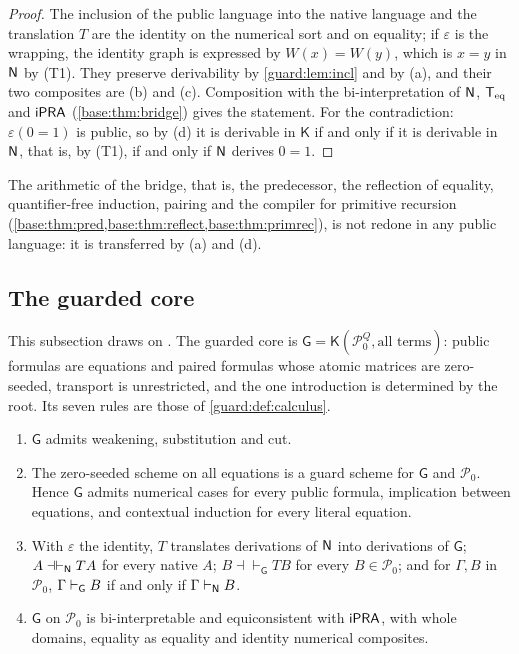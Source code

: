 \begin{proof}
The inclusion of the public language into the native language and the
translation $T$ are the identity on the numerical sort and on equality; if
$\varepsilon$ is the wrapping, the identity graph is expressed by
$W(x)=W(y)$, which is $x=y$ in $\mathsf{N}$ by (T1).  They preserve derivability
by \cref{guard:lem:incl} and by (a), and their two composites are (b) and
(c).  Composition with the bi-interpretation of $\mathsf{N}$, $\mathsf{T}_{\mathrm{eq}}$ and $\mathsf{iPRA}$
(\cref{base:thm:bridge}) gives the statement.  For the contradiction:
$\varepsilon(0=1)$ is public, so by (d) it is derivable in $\mathsf K$ if
and only if it is derivable in $\mathsf{N}$, that is, by (T1), if and only if
$\mathsf{N}$ derives $0=1$.
\end{proof}

The arithmetic of the bridge, that is, the predecessor, the reflection of
equality, quantifier-free induction, pairing and the compiler for primitive
recursion (\cref{base:thm:pred,base:thm:reflect,base:thm:primrec}), is not
redone in any public language: it is transferred by (a) and (d).

\subsection{The guarded core}
\label{guard:sec:core}

This subsection draws on .  The guarded core is
$\mathsf G=\mathsf K(\mathcal P_0^{Q},\text{all terms})$: public formulas
are equations and paired formulas whose atomic matrices are zero-seeded,
transport is unrestricted, and the one introduction is determined by the
root.  Its seven rules are those of \cref{guard:def:calculus}.

\begin{theorem}
\label{guard:thm:core}
\begin{enumerate}[label=\textup{(\roman*)}]
\item $\mathsf G$ admits weakening, substitution and cut.
\item The zero-seeded scheme on all equations is a guard scheme for
 $\mathsf G$ and $\mathcal P_0$.  Hence $\mathsf G$ admits numerical cases
 for every public formula, implication between equations, and contextual
 induction for every literal equation.
\item With $\varepsilon$ the identity, $T$ translates derivations of $\mathsf{N}$
 into derivations of $\mathsf G$; $A\dashv\vdash_{\mathsf{N}}TA$ for every native
 $A$; $B\dashv\vdash_{\mathsf G}TB$ for every $B\in\mathcal P_0$; and for
 $\Gamma,B$ in $\mathcal P_0$, $\Gamma\vdash_{\mathsf G}B$ if and only if
 $\Gamma\vdash_{\mathsf{N}}B$.
\item $\mathsf G$ on $\mathcal P_0$ is bi-interpretable and equiconsistent
 with $\mathsf{iPRA}$, with whole domains, equality as equality and identity
 numerical composites.
\end{enumerate}
\end{theorem}

